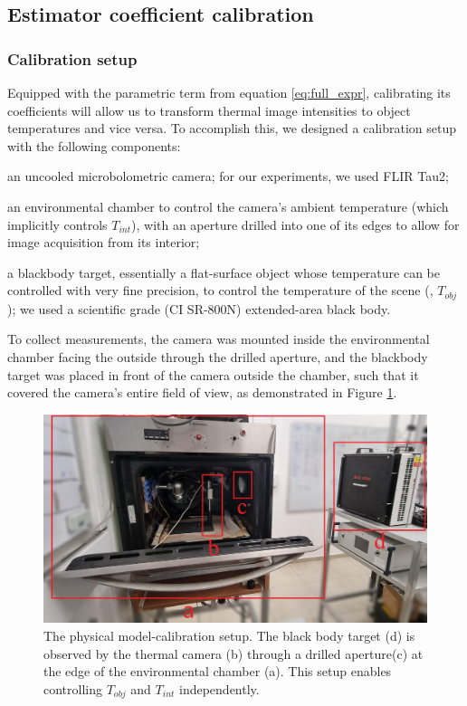 \subsection{Estimator coefficient calibration}
\subsubsection{Calibration setup}
Equipped with the parametric term from equation \ref{eq:full_expr}, calibrating its coefficients will allow us to transform thermal image intensities to object temperatures and vice versa.
To accomplish this, we designed a calibration setup with the following components:
\begin{compactitem}
  \item an uncooled microbolometric camera; for our experiments, we used FLIR Tau2;
  \item an environmental chamber to control the camera's ambient temperature (which implicitly controls $T_\mathit{int}$), with an aperture drilled into one of its edges to allow for image acquisition from its interior;
  \item a blackbody target, essentially a flat-surface object whose temperature can be controlled with very fine precision, to control the temperature of the scene (\ie, $T_\mathit{obj}$);
  we used a scientific grade (CI SR-800N) extended-area black body.
\end{compactitem}
To collect measurements, the camera was mounted inside the environmental chamber facing the outside through the drilled aperture, and the blackbody target was placed in front of the camera outside the chamber, such that it covered the camera's entire field of view, as demonstrated in Figure \ref{calib_setup}.
\begin{figure}[H]
  \centering
  \includegraphics[width=\linewidth]{../figs/methods/calib_setup.jpg}
  \caption{The physical model-calibration setup. The black body target (d) is observed by the thermal camera (b) through a drilled aperture(c) at the edge of the environmental chamber (a). This setup enables controlling $T_\mathit{obj}$ and $T_\mathit{int}$ independently.}
  \label{calib_setup}
\end{figure}

